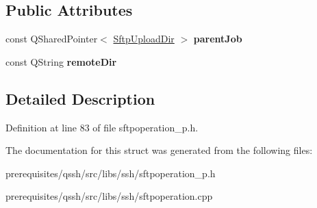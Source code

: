 \subsection*{Public Attributes}
\begin{DoxyCompactItemize}
\item 
\mbox{\label{struct_q_ssh_1_1_internal_1_1_sftp_make_dir_a93c660cea4ebb14e9f1d5c1befcfb541}} 
const Q\+Shared\+Pointer$<$ \mbox{\hyperlink{struct_q_ssh_1_1_internal_1_1_sftp_upload_dir}{Sftp\+Upload\+Dir}} $>$ {\bfseries parent\+Job}
\item 
\mbox{\label{struct_q_ssh_1_1_internal_1_1_sftp_make_dir_a3a50c885de299fd88bc20d653f2eaefd}} 
const Q\+String {\bfseries remote\+Dir}
\end{DoxyCompactItemize}


\subsection{Detailed Description}


Definition at line 83 of file sftpoperation\+\_\+p.\+h.



The documentation for this struct was generated from the following files\+:\begin{DoxyCompactItemize}
\item 
prerequisites/qssh/src/libs/ssh/sftpoperation\+\_\+p.\+h\item 
prerequisites/qssh/src/libs/ssh/sftpoperation.\+cpp\end{DoxyCompactItemize}
